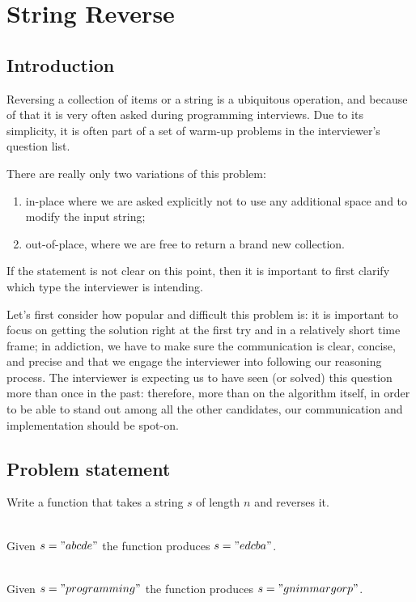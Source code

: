 %

\chapter{String Reverse}
\label{ch:string_reverse}
\section*{Introduction}
Reversing a collection of items or a string is a ubiquitous operation, and because of that it is very often asked during programming interviews. Due to its simplicity, it is often part of a set of warm-up problems in the interviewer's question list. 

There are really only two variations of this problem:

\begin{enumerate}
  \item in-place where we are asked explicitly not to use any additional space and to modify the input string;
  \item out-of-place, where we are free to return a brand new collection.
\end{enumerate}
If the statement is not clear on this point, then it is important to first clarify which type the interviewer is intending. 

Let’s first consider how popular and difficult this problem is: it is important to focus on getting the solution right at the first try and in a relatively short time frame; in addiction, we have to make sure the communication is clear, concise, and precise and that we engage the interviewer into following our reasoning process.
The interviewer is expecting us to have seen (or solved) this question more than once in the past: therefore, more than on the algorithm itself, in order to be able to stand out among all the other candidates, our communication and implementation should be spot-on.


\section{Problem statement}
\begin{exercise}
	Write a function that takes a string $s$ of length $n$ and reverses it.
	
	\begin{example}
		\hfill \\
		Given $s="abcde"$ the function produces $s="edcba"$.
	\end{example}
	
	\begin{example}
		\hfill \\
		Given $s="programming"$ the function produces $s="gnimmargorp"$.
	\end{example}
\end{exercise}


